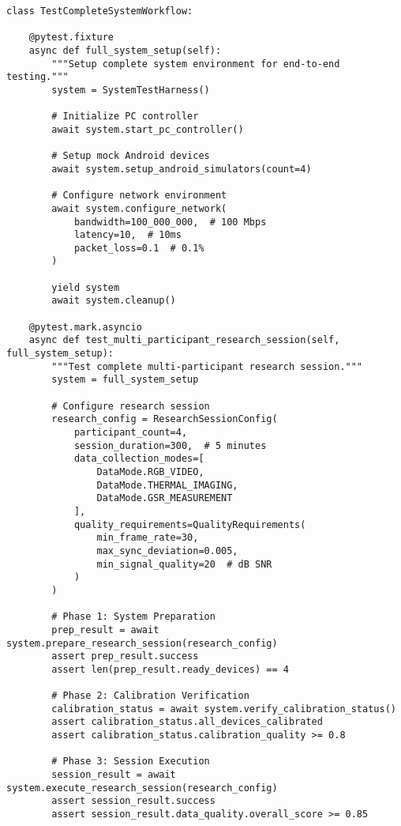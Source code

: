 \documentclass[12pt,a4paper]{article}
\begin{document}
\begin{verbatim}
class TestCompleteSystemWorkflow:
    
    @pytest.fixture
    async def full_system_setup(self):
        """Setup complete system environment for end-to-end testing."""
        system = SystemTestHarness()
        
        # Initialize PC controller
        await system.start_pc_controller()
        
        # Setup mock Android devices
        await system.setup_android_simulators(count=4)
        
        # Configure network environment
        await system.configure_network(
            bandwidth=100_000_000,  # 100 Mbps
            latency=10,  # 10ms
            packet_loss=0.1  # 0.1%
        )
        
        yield system
        await system.cleanup()
    
    @pytest.mark.asyncio
    async def test_multi_participant_research_session(self, full_system_setup):
        """Test complete multi-participant research session."""
        system = full_system_setup
        
        # Configure research session
        research_config = ResearchSessionConfig(
            participant_count=4,
            session_duration=300,  # 5 minutes
            data_collection_modes=[
                DataMode.RGB_VIDEO,
                DataMode.THERMAL_IMAGING,
                DataMode.GSR_MEASUREMENT
            ],
            quality_requirements=QualityRequirements(
                min_frame_rate=30,
                max_sync_deviation=0.005,
                min_signal_quality=20  # dB SNR
            )
        )
        
        # Phase 1: System Preparation
        prep_result = await system.prepare_research_session(research_config)
        assert prep_result.success
        assert len(prep_result.ready_devices) == 4
        
        # Phase 2: Calibration Verification
        calibration_status = await system.verify_calibration_status()
        assert calibration_status.all_devices_calibrated
        assert calibration_status.calibration_quality >= 0.8
        
        # Phase 3: Session Execution
        session_result = await system.execute_research_session(research_config)
        assert session_result.success
        assert session_result.data_quality.overall_score >= 0.85
        

\end{verbatim}
\end{document}
